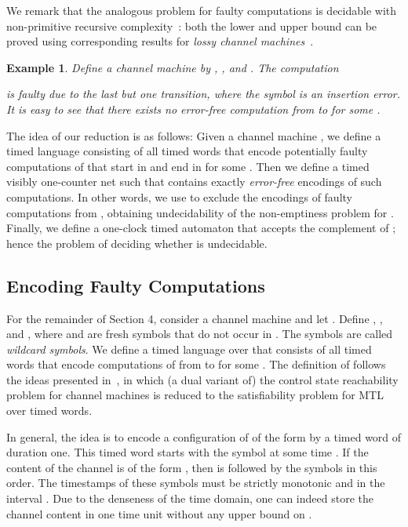 \documentclass{CSML}
\theoremstyle{plain}\newtheorem{theorem}[thm]{Theorem}
\theoremstyle{plain}\newtheorem{corollary}[thm]{Corollary}
\theoremstyle{plain}\newtheorem{example}[thm]{Example}
\theoremstyle{plain}\newtheorem{lemma}[thm]{Lemma}
\theoremstyle{plain}\newtheorem{remark}[thm]{Remark}
\begin{document}
We remark that the analogous problem for faulty computations is decidable with non-primitive recursive complexity~\cite{DBLP:journals/fuin/AbdullaDOQW08}: both the lower and upper bound can be proved using corresponding results for \emph{lossy channel machines}~\cite{DBLP:journals/tcs/AbdullaJ03,DBLP:journals/ipl/Schnoebelen02}.

\begin{example}
	\label{example_encoding}
	Define a channel machine  by , , and . 
	The computation	
	 
	is faulty due to the last but one transition, where the symbol  is an insertion error. 	
	It is easy to see that there exists no error-free computation from  to  for some . 
\end{example}

The idea of our reduction is as follows: 
Given a channel machine , we define a timed language  consisting of all timed words that encode potentially faulty computations of  that start in  and end in  for some . 
Then we define a timed visibly one-counter net  such that  contains exactly \emph{error-free} encodings of such computations. In other words, we use  to exclude the encodings of faulty computations from , 
obtaining undecidability of the non-emptiness problem for . 
Finally, we define a one-clock timed automaton  that accepts the complement of ; hence the problem of deciding whether  is undecidable. 


\subsection{Encoding Faulty Computations}
For the remainder of Section 4, consider a channel machine 
 and let . 
Define 
,
,
and ,
where  and  are fresh symbols that do not occur in . The symbols  are called \emph{wildcard symbols}. 
We define a timed language  over  that consists of all timed words that encode computations of  from  to  for some . 
The definition of  follows the ideas presented in~\cite{DBLP:conf/lics/OuaknineW05}, in which (a dual variant of) the 
control state reachability problem for channel machines is reduced to the satisfiability problem for MTL over timed words.


In general, the idea is to encode a configuration of  of the form  by a timed word of duration one. 
This timed word starts with the symbol  at some time .
If the content of the channel  is of the form , 
then  is followed by the symbols  in this order. The timestamps of these symbols must be strictly monotonic and in the interval . 
Due to the denseness of the time domain, one can indeed store the channel content in one time unit without any upper bound on .
\end{document}
